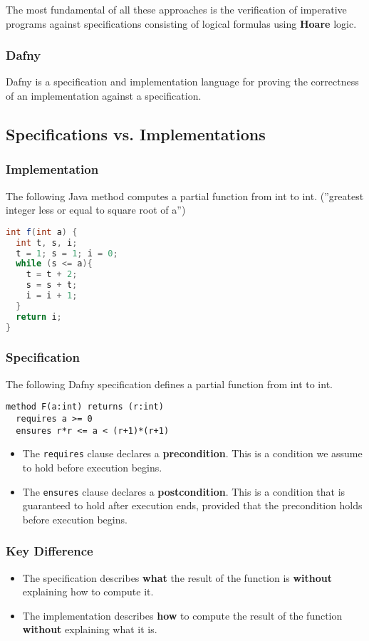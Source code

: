 \begin{multicols}{2}
The most fundamental of all these approaches is the verification of imperative programs against specifications consisting of logical formulas using \textbf{Hoare} logic.

\subsubsection{Dafny}
Dafny is a specification and implementation language for proving the correctness of an implementation against a specification.

\subsection{Specifications vs. Implementations}

\subsubsection{Implementation}
The following Java method computes a partial function from int to int.
(''greatest integer less or equal to square root of a'')
\begin{lstlisting}[language=Java]
int f(int a) {
  int t, s, i;
  t = 1; s = 1; i = 0;
  while (s <= a){
    t = t + 2;
    s = s + t;
    i = i + 1;
  }
  return i;
}
\end{lstlisting}

\subsubsection{Specification}
The following Dafny specification defines a partial function from int to int. 
\begin{lstlisting}
method F(a:int) returns (r:int)
  requires a >= 0
  ensures r*r <= a < (r+1)*(r+1)
\end{lstlisting}

\begin{itemize}
  \item The \lstinline{requires} clause declares a \textbf{precondition}. This is a condition we assume to hold before execution begins.%
  \item The \lstinline{ensures} clause declares a \textbf{postcondition}. This is a condition that is guaranteed to hold after execution ends, provided that the precondition holds before execution begins.
\end{itemize}

\subsubsection{Key Difference}
\begin{itemize}
  \item The specification describes \textbf{what} the result of the function is \textbf{without} explaining how to compute it.
  \item The implementation describes \textbf{how} to compute the result of the function \textbf{without} explaining what it is.
\end{itemize}


\end{multicols}
